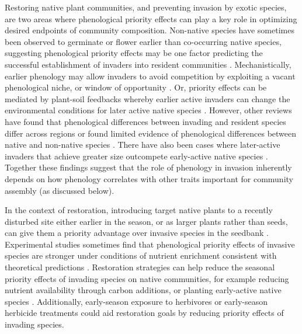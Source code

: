 \documentclass[11pt]{article}
\begin{document}
Restoring native plant communities, and preventing invasion by exotic species, are two areas where phenological priority effects can play a key role in optimizing desired endpoints of community composition. Non-native species have sometimes been observed to germinate \citep{wainwright2012seasonal,wilsey2011biodiversity,marushia2010phenology} or flower \citep{cleland2013strengthening} earlier than co-occurring native species, suggesting phenological priority effects may be one factor predicting the successful establishment of invaders into resident communities \citep{wolkovich2011phenology,alexander2019earlier}. Mechanistically, earlier phenology may allow invaders to avoid competition by exploiting a vacant phenological niche, or window of opportunity \citep{gioria2014resource}. Or, priority effects can be mediated by plant-soil feedbacks whereby earlier active invaders can change the environmental conditions for later active native species \citep{grman2010within}. However, other reviews have found that phenological differences between invading and resident species differ across regions \citep{godoy2009flowering} or found limited evidence of phenological differences between native and non-native species \citep{zettlemoyer2022limited}. There have also been cases where later-active invaders that achieve greater size outcompete early-active native species \citep{godoy2014}. Together these findings suggest that the role of phenology in invasion inherently depends on how phenology correlates with other traits important for community assembly (as discussed below).

In the context of restoration, introducing target native plants to a recently disturbed site either earlier in the season, or as larger plants rather than seeds, can give them a priority advantage over invasive species in the seedbank \citep{young2017using,wilsey2021restoration}. Experimental studies sometimes find that phenological priority effects of invasive species are stronger under conditions of nutrient enrichment \citep{kardol2013resource,valliere2022phenological}  consistent with theoretical predictions \citep{vannette2014historical}.  Restoration strategies can help reduce the seasonal priority effects of invading species on native communities, for example reducing nutrient availability through carbon additions, or planting early-active native species \citep{cleland2013strengthening,hess2019priority}. Additionally, early-season exposure to herbivores \citep{waterton2016trade} or early-season herbicide treatments \citep{marushia2010phenology} could aid restoration goals by reducing priority effects of invading species.
\end{document}
